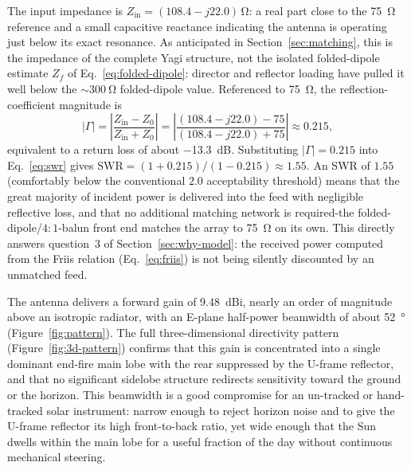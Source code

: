 The input impedance is $Z_\mathrm{in}=(108.4 - j22.0)\,\si{\ohm}$: a real part close
to the \SI{75}{\ohm} reference and a small capacitive reactance indicating the
antenna is operating just below its exact resonance. As anticipated in
Section~\ref{sec:matching}, this is the impedance of the complete Yagi
structure, not the isolated folded-dipole estimate $Z_f$ of
Eq.~\eqref{eq:folded-dipole}: director and reflector loading have pulled it
well below the $\sim\!\SI{300}{\ohm}$ folded-dipole value. Referenced to
\SI{75}{\ohm}, the reflection-coefficient magnitude is
\begin{equation}
    |\Gamma| = \left|\frac{Z_\mathrm{in}-Z_0}{Z_\mathrm{in}+Z_0}\right|
             = \left|\frac{(108.4-j22.0)-75}{(108.4-j22.0)+75}\right|
             \approx 0.215,
    \label{eq:gamma-single}
\end{equation}
equivalent to a return loss of about \SI{-13.3}{dB}. Substituting $|\Gamma|=0.215$
into Eq.~\eqref{eq:swr} gives $\mathrm{SWR}=(1+0.215)/(1-0.215)\approx 1.55$.
An SWR of $1.55$ (comfortably below the conventional $2.0$ acceptability
threshold) means that the great majority of incident power is delivered into the
feed with negligible reflective loss, and that no additional matching network is
required-the folded-dipole/$4{:}1$-balun front end matches the array to
\SI{75}{\ohm} on its own. This directly answers question~3 of
Section~\ref{sec:why-model}: the received power computed from the Friis
relation (Eq.~\eqref{eq:friis}) is not being silently discounted by an
unmatched feed.

The antenna delivers a forward gain of \SI{9.48}{dBi}, nearly an order of
magnitude above an isotropic radiator, with an E-plane half-power beamwidth of
about \SI{52}{\degree} (Figure~\ref{fig:pattern}). The full three-dimensional
directivity pattern (Figure~\ref{fig:3d-pattern}) confirms that this gain is
concentrated into a single dominant end-fire main lobe with the rear suppressed
by the U-frame reflector, and that no significant sidelobe structure redirects
sensitivity toward the ground or the horizon. This beamwidth is a good
compromise for an un-tracked or hand-tracked solar instrument: narrow enough to
reject horizon noise and to give the U-frame reflector its high front-to-back
ratio, yet wide enough that the Sun dwells within the main lobe for a useful
fraction of the day without continuous mechanical steering.

